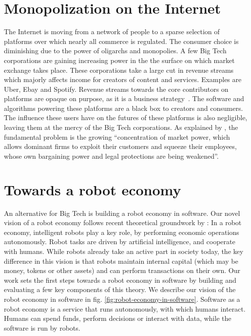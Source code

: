 \section{Monopolization on the Internet}
The Internet is moving from a network of people to a sparse selection of platforms over which nearly all commerce is regulated. The consumer choice is diminishing due to the power of oligarchs and monopolies. A few Big Tech corporations are gaining increasing power in the the surface on which market exchange takes place. These corporations take a large cut in revenue streams which majorly affects income for creators of content and services. Examples are Uber, Ebay and Spotify. Revenue streams towards the core contributors on platforms are opaque on purpose, as it is a business strategy~\citep{music2015fair}. The software and algorithms powering these platforms are a black box to creators and consumers. The influence these users have on the futures of these platforms is also negligible, leaving them at the mercy of the Big Tech corporations. As explained by \citep{stiglitz2019market}, the fundamental problem is the growing ``concentration of market power, which allows dominant firms to exploit their customers and squeeze their employees, whose own bargaining power and legal protections are being weakened''.

\section{Towards a robot economy}
An alternative for Big Tech is building a robot economy in software. Our novel vision of a robot economy follows recent theoretical groundwork by \cite{arduengo2020robot}: In a robot economy, intelligent robots play a key role, by performing economic operations autonomously. Robot tasks are driven by artificial intelligence, and cooperate with humans. While robots already take an active part in society today, the key difference in this vision is that robots maintain internal capital (which may be money, tokens or other assets) and can perform transactions on their own. Our work sets the first steps towards a robot economy in software by building and evaluating a few key components of this theory. We describe our vision of the robot economy in software in fig. \ref{fig:robot-economy-in-software}. Software as a robot economy is a service that runs autonomously, with which humans interact. Humans can spend funds, perform decisions or interact with data, while the software is run by robots.

